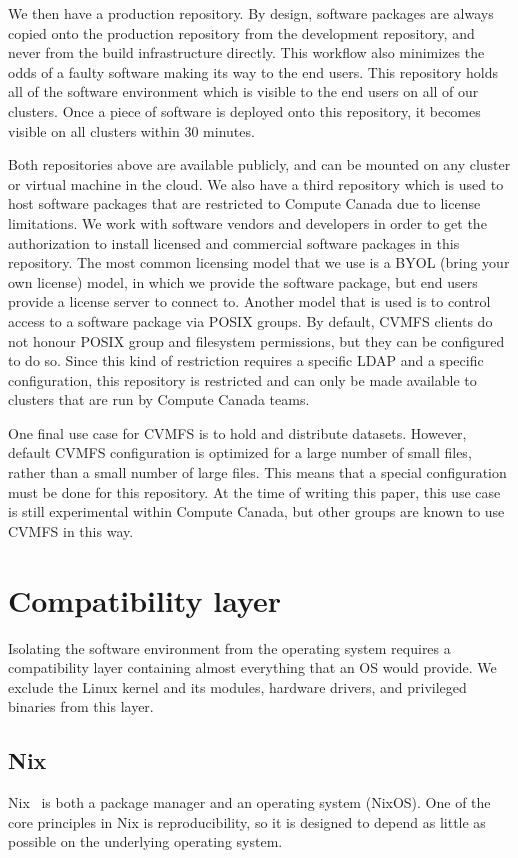 \documentclass[sigconf]{acmart}
\begin{document}
We then have a production repository. By design, software packages are always copied onto the production repository from the development repository, and never from the build infrastructure directly. This workflow also minimizes the odds of a faulty software making its way to the end users. This repository holds all of the software environment which is visible to the end users on all of our clusters. Once a piece of software is deployed onto this repository, it becomes visible on all clusters within 30 minutes. 

Both repositories above are available publicly, and can be mounted on any cluster or virtual machine in the cloud. We also have a third repository which is used to host software packages that are restricted to Compute Canada due to license limitations. We work with software vendors and developers in order to get the authorization to install licensed and commercial software packages in this repository. The most common licensing model that we use is a BYOL (bring your own license) model, in which we provide the software package, but end users provide a license server to connect to. Another model that is used is to control access to a software package via POSIX groups. By default, CVMFS clients do not honour POSIX group and filesystem permissions, but they can be configured to do so. Since this kind of restriction requires a specific LDAP and a specific configuration, this repository is restricted and can only be made available to clusters that are run by Compute Canada teams. 

One final use case for CVMFS is to hold and distribute datasets. However, default CVMFS configuration is optimized for a large number of small files, rather than a small number of large files. This means that a special configuration must be done for this repository. At the time of writing this paper, this use case is still experimental within Compute Canada, but other groups are known to use CVMFS in this way.

\section{Compatibility layer}
\label{sec:Compatibility_layer}
Isolating the software environment from the operating system requires a compatibility layer containing almost everything that an OS would provide. We exclude the Linux kernel and its modules, hardware drivers, and privileged binaries from this layer.

\subsection{Nix}
\label{sub:Nix}
Nix~\cite{Nix} is both a package manager and an operating system (NixOS). One of the core principles in Nix is reproducibility, so it is designed to depend as little as possible on the underlying operating system. 
\end{document}
